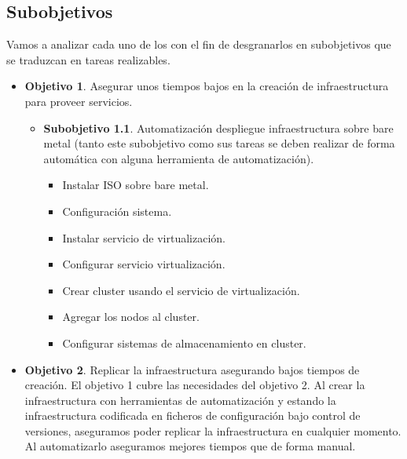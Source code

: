 	\subsection{Subobjetivos}
	\label{subobjetivos}
		\begin{text}
			Vamos a analizar cada uno de los  con el fin de desgranarlos en subobjetivos que se traduzcan en tareas realizables. 
			\begin{itemize}
				\item \textbf{Objetivo 1}. Asegurar unos tiempos bajos en la creación de infraestructura para proveer servicios.
				\begin{itemize}
					\item \textbf{Subobjetivo 1.1}. Automatización despliegue infraestructura sobre bare metal (tanto este subobjetivo como sus tareas se deben realizar de forma automática con alguna herramienta de automatización).
					\begin{itemize}
						\item Instalar ISO sobre bare metal.
						\item Configuración sistema.
						\item Instalar servicio de virtualización.
						\item Configurar servicio virtualización.
						\item Crear cluster usando el servicio de virtualización.
						\item Agregar los nodos al cluster.
						\item Configurar sistemas de almacenamiento en cluster.
					\end{itemize}
				\end{itemize}
				\item \textbf{Objetivo 2}. Replicar la infraestructura asegurando bajos tiempos de creación. El objetivo 1 cubre las necesidades del objetivo 2. Al crear la infraestructura con herramientas de automatización y estando la infraestructura codificada en ficheros de configuración bajo control de versiones, aseguramos poder replicar la infraestructura en cualquier momento. Al automatizarlo aseguramos mejores tiempos que de forma manual.
				

\end{itemize}
\end{text}
